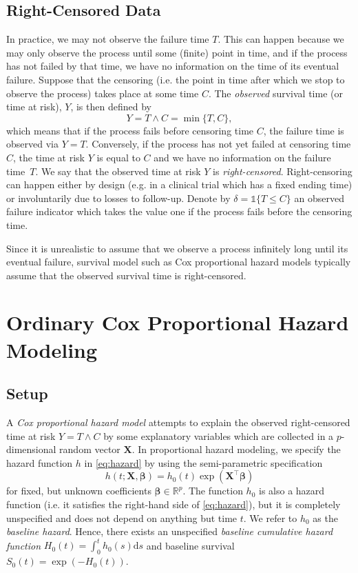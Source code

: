 \documentclass[11pt]{article}
\newcommand{\R}{\mathbb{R}}
\newcommand{\X}{\mathbf{X}}
\renewcommand{\b}{\bm{\beta}}
\renewcommand{\d}{\text{d}}
\newcommand{\indic}{\mathds{1}}
\begin{document}
\subsection{Right-Censored Data}
In practice, we may not observe the failure time $T$. This can happen because we may only observe the process until some (finite) point in time, and if the process has not failed by that time, we have no information on the time of its eventual failure. Suppose that the censoring (i.e. the point in time after which we stop to observe the process) takes place at some time $C$. The \textit{observed} survival time (or time at risk), $Y$, is then defined by
\[
	Y = T \wedge C = \min\{T, C\},
\]
which means that if the process fails before censoring time $C$, the failure time is observed via $Y = T$. Conversely, if the process has not yet failed at censoring time $C$, the time at risk $Y$ is equal to $C$ and we have no information on the failure time~$T$. We say that the observed time at risk $Y$ is \textit{right-censored}. Right-censoring can happen either by design (e.g. in a clinical trial which has a fixed ending time) or involuntarily due to losses to follow-up. Denote by $\delta = \indic\{T \leq C\}$ an observed failure indicator which takes the value one if the process fails before the censoring time. 

Since it is unrealistic to assume that we observe a process infinitely long until its eventual failure, survival model such as Cox proportional hazard models typically assume that the observed survival time is right-censored.


\section{Ordinary Cox Proportional Hazard Modeling}
\subsection{Setup}
A \textit{Cox proportional hazard model} \citep{cox1972} attempts to explain the observed right-censored time at risk $Y = T \wedge C$ by some explanatory variables which are collected in a $p$-dimensional random vector $\X$. In proportional hazard modeling, we specify the hazard function $h$ in \eqref{eq:hazard} by using the semi-parametric specification
\begin{equation} \label{eq:hazard-proportional}
	h(t ; \X, \b) = h_0(t) \exp\left( \X^\top \b \right)
\end{equation}
for fixed, but unknown coefficients $\b\in\R^p$. The function $h_0$ is also a hazard function (i.e. it satisfies the right-hand side of \eqref{eq:hazard}), but it is completely unspecified and does not depend on anything but time $t$. We refer to $h_0$ as the \textit{baseline hazard}. Hence, there exists an unspecified \textit{baseline cumulative hazard function} $H_0(t) = \int_0^t h_0(s) \d s$ and baseline survival $S_0(t) = \exp(- H_0(t))$.
\end{document}
